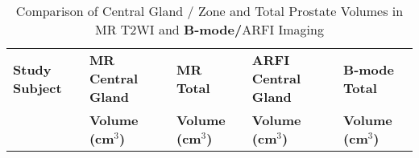 \begin{table}[h!]
\centering
\caption{Comparison of Central Gland / Zone and Total Prostate Volumes in MR T2WI and \textbf{B-mode/}ARFI Imaging}
\begin{tabular}{|l|l|l|l|l|} \hline
{\bf Study Subject} & {\bf MR Central Gland} & {\bf MR Total} & {\bf ARFI Central Gland} & {\bf B-mode Total} \\ 
& {\bf Volume (cm$^3$)} & {\bf Volume (cm$^3$)} & {\bf Volume (cm$^3$)} & {\bf Volume (cm$^3$)} \\ \hline

\hline
\end{tabular}
\label{tab:mr_arfi_volumes}
\end{table}

